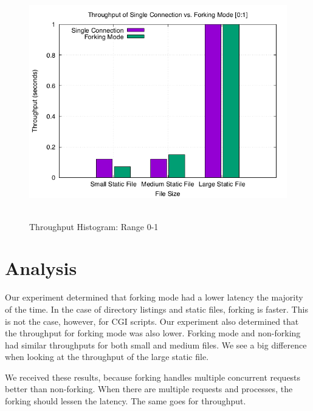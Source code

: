 \documentclass{article}
\begin{document}
        \begin{figure}[H]
            \centering
            \includegraphics[height=4in]{throughput2.png}
            \caption{Throughput Histogram: Range 0-1}
            \label{fig:throughput_graph}
        \end{figure}
    
    \section*{Analysis}
    Our experiment determined that forking mode had a lower latency the majority of the time.  In the case of directory listings and static files, forking is faster.  This is not the case, however, for CGI scripts.  Our experiment also determined that the throughput for forking mode was also lower.  Forking mode and non-forking had similar throughputs for both small and medium files.  We see a big difference when looking at the throughput of the large static file.
    
    We received these results, because forking handles multiple concurrent requests better than non-forking.  When there are multiple requests and processes, the forking should lessen the latency.  The same goes for throughput.
    
    
\end{document}
